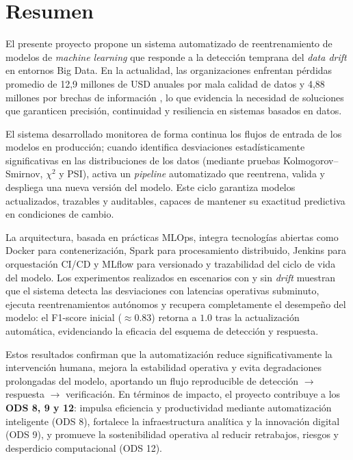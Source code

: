 
\chapter*{Resumen}
El presente proyecto propone un sistema automatizado de reentrenamiento de modelos de \textit{machine learning} que responde a la detección temprana del \textit{data drift} en entornos Big Data. En la actualidad, las organizaciones enfrentan pérdidas promedio de 12{,}9 millones de USD anuales por mala calidad de datos y 4{,}88 millones por brechas de información \citep{Gartner2024,IBM2024}, lo que evidencia la necesidad de soluciones que garanticen precisión, continuidad y resiliencia en sistemas basados en datos.

El sistema desarrollado monitorea de forma continua los flujos de entrada de los modelos en producción; cuando identifica desviaciones estadísticamente significativas en las distribuciones de los datos (mediante pruebas Kolmogorov--Smirnov, $\chi^2$ y PSI), activa un \textit{pipeline} automatizado que reentrena, valida y despliega una nueva versión del modelo. Este ciclo garantiza modelos actualizados, trazables y auditables, capaces de mantener su exactitud predictiva en condiciones de cambio.

La arquitectura, basada en prácticas MLOps, integra tecnologías abiertas como Docker para contenerización, Spark para procesamiento distribuido, Jenkins para orquestación CI/CD y MLflow para versionado y trazabilidad del ciclo de vida del modelo. Los experimentos realizados en escenarios con y sin \textit{drift} muestran que el sistema detecta las desviaciones con latencias operativas subminuto, ejecuta reentrenamientos autónomos y recupera completamente el desempeño del modelo: el F1-score inicial ($\approx 0.83$) retorna a $1.0$ tras la actualización automática, evidenciando la eficacia del esquema de detección y respuesta.

Estos resultados confirman que la automatización reduce significativamente la intervención humana, mejora la estabilidad operativa y evita degradaciones prolongadas del modelo, aportando un flujo reproducible de detección $\rightarrow$ respuesta $\rightarrow$ verificación. En términos de impacto, el proyecto contribuye a los \textbf{ODS 8, 9 y 12}: impulsa eficiencia y productividad mediante automatización inteligente (ODS 8), fortalece la infraestructura analítica y la innovación digital (ODS 9), y promueve la sostenibilidad operativa al reducir retrabajos, riesgos y desperdicio computacional (ODS 12).

